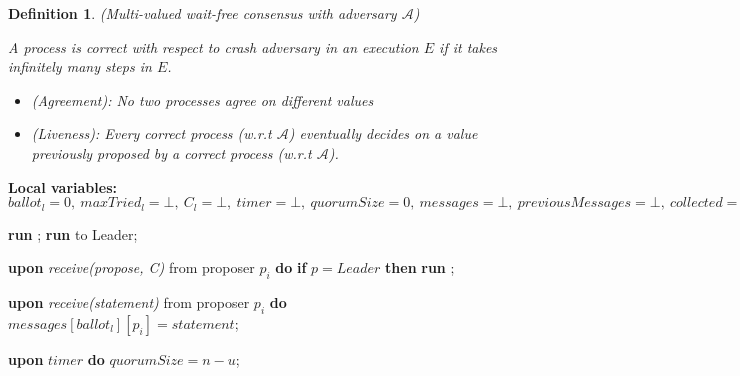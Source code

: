 \documentclass[10pt,pdftex,a4paper]{article}%
\newtheorem{definition}{Definition}
\begin{document}
\begin{definition}
(Multi-valued wait-free consensus with adversary $\mathcal{A}$)

A process is \emph{correct} with respect to crash adversary 
in an execution $E$ if it takes infinitely many steps in $E$.
%
\begin{itemize}
\item (Agreement): No two processes agree on different values  
\item (Liveness): Every correct process (w.r.t $\mathcal{A}$) 
eventually decides on a value previously proposed by a correct process (w.r.t $\mathcal{A}$).
\end{itemize}
%
\end{definition}
%
%
\begin{algorithm}
\caption{Generalized Paxos - Proposer p}
\textbf{Local variables:} $ballot_l = 0,\ maxTried_l = \bot,\ C_l = \bot,\ timer = \bot,\ quorumSize = 0,\ messages = \bot,\ previousMessages = \bot,\ collected = False,\ verification = False, \ currentPhase = \bot$
\begin{algorithmic}[1]

        \State \textbf{run} ;
    \Else
        \State \textbf{run}  to Leader;
    \EndIf
    \EndFunction
        
    \State
    \State \textbf{upon} \textit{receive(propose, C)} from proposer $p_i$ \textbf{do} 
        \State \hspace{\algorithmicindent} \textbf{if} $p = Leader$ \textbf{then}
            \State \hspace{\algorithmicindent}\hspace{\algorithmicindent} \textbf{run} ;
    
    \State
    \State \textbf{upon} \textit{receive(statement)} from proposer $p_i$ \textbf{do}
    \State \hspace{\algorithmicindent} $messages[ballot_l][p_i] = statement$;
    
    \State
    \State \textbf{upon} $timer$ \textbf{do} 
    \State \hspace{\algorithmicindent} $quorumSize = n-u$;


\end{algorithmic}
\end{algorithm}
\end{document}
